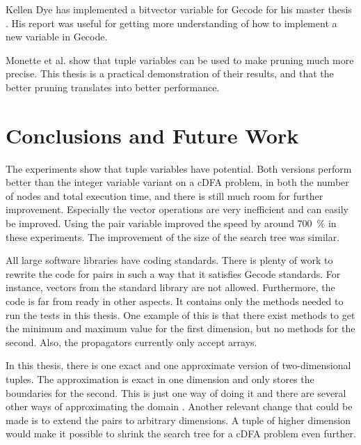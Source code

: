 \documentclass[a4paper,11pt]{article}
\begin{document}
Kellen Dye \cite{Dye761927} has implemented a bitvector variable for Gecode for his master thesis \cite{Dye761927}. His report was useful for getting more understanding of how to implement a new variable in Gecode.

Monette et al. \cite{Monette771427} show that tuple variables can be used to make pruning much more precise. This thesis is a practical demonstration of their results, and that the better pruning translates into better performance.

\section{Conclusions and Future Work}
The experiments show that tuple variables have potential. Both versions perform better than the integer variable variant on a cDFA problem, in both the number of nodes and total execution time, and there is still much room for further improvement. Especially the vector operations are very inefficient and can easily be improved. Using the pair variable improved the speed by around \SI{700}{\percent} in these experiments. The improvement of the size of the search tree was similar.

All large software libraries have coding standards. There is plenty of work to rewrite the code for pairs in such a way that it satisfies Gecode standards. For instance, vectors from the standard library are not allowed. Furthermore, the code is far from ready in other aspects. It contains only the methods needed to run the tests in this thesis. One example of this is that there exist methods to get the minimum and maximum value for the first dimension, but no methods for the second. Also, the propagators currently only accept arrays. 

In this thesis, there is one exact and one approximate version of two-dimensional tuples. The approximation is exact in one dimension and only stores the boundaries for the second. This is just one way of doing it and there are several other ways of approximating the domain \cite{Monette771427}. Another relevant change that could be made is to extend the pairs to arbitrary dimensions. A tuple of higher dimension would make it possible to shrink the search tree for a cDFA problem even further.




\end{document}
